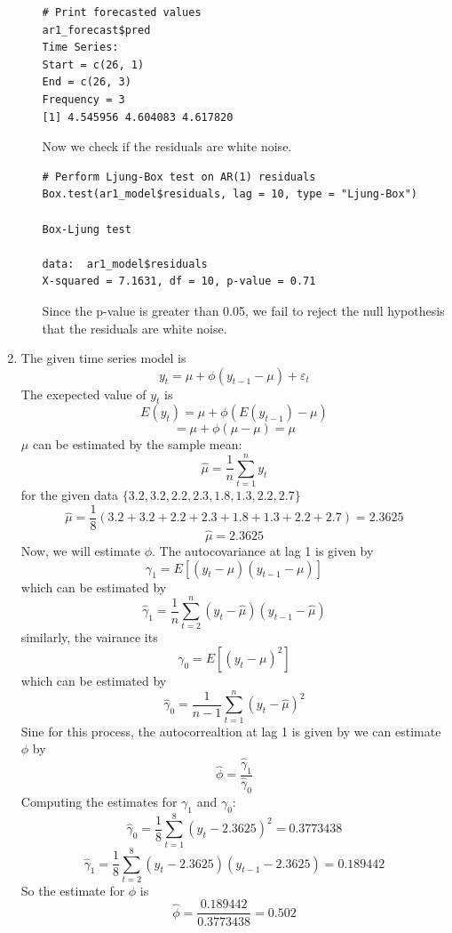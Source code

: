 \documentclass[12pt]{article}
\begin{document}
\begin{enumerate}
\begin{enumerate}
\begin{verbatim}
# Print forecasted values
ar1_forecast$pred
Time Series:
Start = c(26, 1) 
End = c(26, 3) 
Frequency = 3 
[1] 4.545956 4.604083 4.617820
\end{verbatim} 
    Now we check if the residuals are white noise.
\begin{verbatim}
# Perform Ljung-Box test on AR(1) residuals
Box.test(ar1_model$residuals, lag = 10, type = "Ljung-Box")

Box-Ljung test

data:  ar1_model$residuals
X-squared = 7.1631, df = 10, p-value = 0.71
\end{verbatim}
    Since the p-value is greater than 0.05, 
    we fail to reject the null hypothesis that the 
    residuals are white noise.
    \end{enumerate}
    \item The given time series model is
    \[
        y_t = \mu + \phi(y_{t-1} - \mu) + \varepsilon_t
    \]
    The exepected value of $y_t$ is
    \[
        E(y_t) = \mu + \phi(E(y_{t-1}) - \mu)
    \]
    \[
       = \mu + \phi(\mu - \mu) = \mu
    \]
    $\mu$ can be estimated by the sample mean:
    \[
        \hat{\mu} = \frac{1}{n} \sum_{t=1}^{n} y_t
    \]
    for the given data $\{3.2,3.2,2.2,2.3,1.8,1.3,2.2,2.7\}$
    \[
        \hat{\mu} = \frac{1}{8} (3.2 + 3.2 + 2.2 + 2.3 + 1.8 + 1.3 + 2.2 + 2.7) = 2.3625
    \]
    \[
        \hat{\mu} = 2.3625
    \]
    Now, we will estimate $\phi$.
    The autocovariance at lag 1 is given by
    \[
        \gamma_1 = E[(y_t - \mu)(y_{t-1} - \mu)]
    \]
    which can be estimated by
    \[
        \hat{\gamma}_1 = \frac{1}{n} \sum_{t=2}^{n} (y_t - \hat{\mu})(y_{t-1} - \hat{\mu})
    \]
    similarly, the vairance its
    \[
        \gamma_0 = E[(y_t - \mu)^2]
    \]
    which can be estimated by
    \[
        \hat{\gamma}_0 = \frac{1}{n-1} \sum_{t=1}^{n} (y_t - \hat{\mu})^2
    \]
    Sine for this process, the autocorrealtion at lag 1 is given by
    we can estimate $\phi$ by
    \[
        \hat{\phi} = \frac{\hat{\gamma}_1}{\hat{\gamma}_0}
    \]
    Computing the estimates for $\gamma_1$ and $\gamma_0$:
    \[ 
    \hat{\gamma}_0 = \frac{1}{8} 
    \sum_{t=1}^{8} (y_t - 2.3625)^2 = 0.3773438
    \]
    \[
    \hat{\gamma}_1 = \frac{1}{8}
    \sum_{t=2}^{8} (y_t - 2.3625)(y_{t-1} - 2.3625) = 0.189442
    \]
    So the estimate for $\phi$ is
    \[
        \hat{\phi} = \frac{0.189442}{0.3773438} = 0.502
    \]

\end{enumerate}
\end{document}
